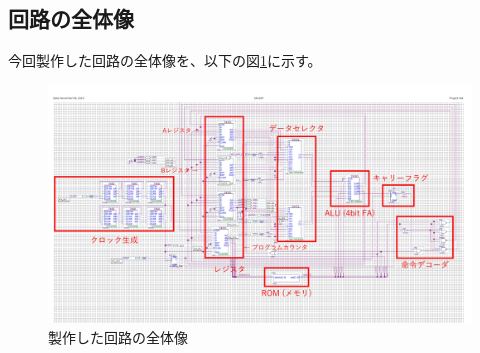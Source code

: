 \documentclass[dvipdfmx,a4j, titlepage]{jsarticle}
\begin{document}
\subsection{回路の全体像}
今回製作した回路の全体像を、以下の図\ref{circuit_diagram}に示す。

\begin{figure}[H]
    \begin{center}
        \includegraphics[width=165mm]{img/circuit_diagram.jpg}
    \end{center}
    \caption{製作した回路の全体像}
    \label{circuit_diagram}
\end{figure}
\end{document}
